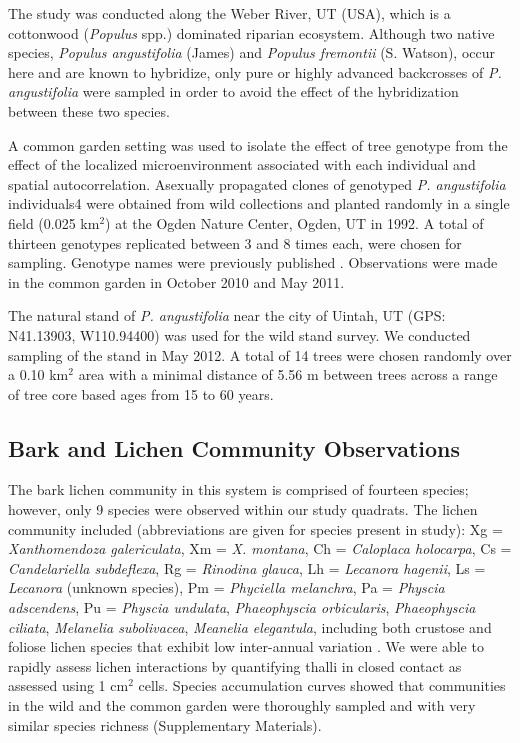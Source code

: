 \documentclass[fleqn,10pt]{wlscirep}
\begin{document}
The study was conducted along the Weber River, UT (USA), which is a
cottonwood (\textit{Populus} spp.) dominated riparian
ecosystem. Although two native species, \textit{Populus angustifolia}
(James) and \textit{Populus fremontii} (S. Watson), occur here and are
known to hybridize, only pure or highly advanced backcrosses of
\textit{P. angustifolia} were sampled in order to avoid the effect of
the hybridization between these two species.

A common garden setting was used to isolate the effect of tree
genotype from the effect of the localized microenvironment associated
with each individual and spatial autocorrelation. Asexually propagated
clones of genotyped \textit{P. angustifolia} individuals4 were
obtained from wild collections and planted randomly in a single field
(0.025 km$^2$) at the Ogden Nature Center, Ogden, UT in 1992. A total
of thirteen genotypes replicated between 3 and 8 times each, were
chosen for sampling. Genotype names were previously published
\cite{Ellison2005}. Observations were made in the common garden in
October 2010 and May 2011.

The natural stand of \textit{P. angustifolia} near the city of Uintah,
UT (GPS:  N41.13903, W110.94400) was used for the wild stand
survey. We conducted sampling of the stand in May 2012. A total of 14
trees were chosen randomly over a 0.10 km$^2$ area with a minimal
distance of 5.56 m between trees across a range of tree core based
ages from 15 to 60 years.

\subsection*{Bark and Lichen Community Observations}

The bark lichen community in this system is comprised of fourteen
species; however, only 9 species were observed within our study
quadrats. The lichen community included (abbreviations are given for
species present in study): Xg = \textit{Xanthomendoza galericulata},
Xm = \textit{X. montana}, Ch = \textit{Caloplaca holocarpa}, Cs =
\textit{Candelariella subdeflexa}, Rg = \textit{Rinodina glauca}, Lh =
\textit{Lecanora hagenii}, Ls = \textit{Lecanora} (unknown species),
Pm = \textit{Phyciella melanchra}, Pa = \textit{Physcia adscendens},
Pu = \textit{Physcia undulata}, \textit{Phaeophyscia orbicularis},
\textit{Phaeophyscia ciliata}, \textit{Melanelia subolivacea},
\textit{Meanelia elegantula}, including both crustose and foliose
lichen species that exhibit low inter-annual variation
\cite{Ellison2005}. We were able to rapidly assess lichen interactions
by quantifying thalli in closed contact as assessed using 1 cm$^2$
cells. Species accumulation curves showed that communities in the wild
and the common garden were thoroughly sampled and with very similar
species richness (Supplementary Materials). 
\end{document}
